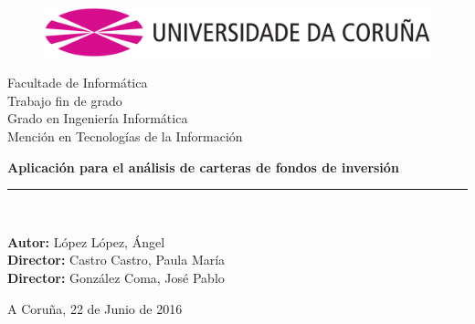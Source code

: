 \documentclass[12pt, a4paper]{book}
\newcommand*\parttitle{}
\let\origpart\part
\renewcommand*{\part}[2][]{%
	\ifx\\#1\\%
	\origpart{#2}%
	\renewcommand*\parttitle{#2}%
	\else
	\origpart[#1]{#2}%
	\renewcommand*\parttitle{#1}%
	\fi
}
\begin{document}
\renewcommand{\partname}{Capítulo}
\renewcommand{\tablename}{Tabla}
\renewcommand{\acronymname }{Acrónimos}
\let\Oldpart\part


\begin{titlepage}

\begin{center}
\vspace*{-0.2in}
\begin{figure}[htb]
\begin{center}
\includegraphics[width=12cm]{figuras/logo.png}
\end{center}
\end{figure}
\vspace*{0.6in}
{\Large Facultade de Informática}\\[1.25cm]
\vspace*{0.15in}
{\LARGE Trabajo fin de grado}\\[0.75cm]
{\LARGE  Grado en Ingeniería Informática}\\[0.5cm]
{Mención en Tecnologías de la Información }\\[1.25cm]
\vspace*{0.6in}
\vspace*{0.2in}
\begin{Large}
\textbf{Aplicación para el análisis de carteras de fondos de inversión} \\
\end{Large}
\vspace*{2in}
\vspace*{0.3in}
\rule{80mm}{0.1mm}\\
\vspace*{0.1in}
\begin{large}
\textbf{Autor:} López López, Ángel\\
\textbf{Director:} Castro Castro, Paula María\\
\textbf{Director:} González Coma, José Pablo \\
\end{large}
\vspace*{0.3in}
A Coruña, 22 de Junio de 2016
\end{center}

\end{titlepage}
\end{document}
